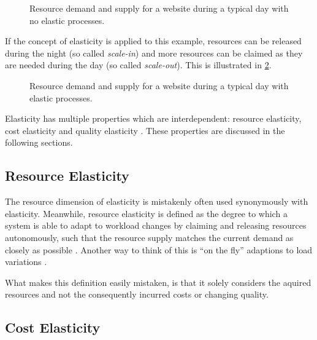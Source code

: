 \begin{figure}
    \centering
    
    \caption{Resource demand and supply for a website during a typical day with no elastic processes.}
    \label{fig:elasticity-application-no-scaling}
\end{figure}

If the concept of elasticity is applied to this example, resources can be released during the night (so called \textit{scale-in}) and more resources can be claimed as they are needed during the day (so called \textit{scale-out}). This is illustrated in \cref{fig:elasticity-application-scaling}.

\begin{figure}
    \centering
    
    \caption{Resource demand and supply for a website during a typical day with elastic processes.}
    \label{fig:elasticity-application-scaling}
\end{figure}

Elasticity has multiple properties which are interdependent: resource elasticity, cost elasticity and quality elasticity \cite{dustdarPrinciplesElasticProcesses2011}. These properties are discussed in the following sections.

\subsection{Resource Elasticity}

The resource dimension of elasticity is mistakenly often used synonymously with elasticity. Meanwhile, resource elasticity is defined as the degree to which a system is able to adapt to workload changes by claiming and releasing resources autonomously, such that the resource supply matches the current demand as closely as possible \cite{herbstElasticityCloudComputing2013}. Another way to think of this is ``on the fly'' adaptions to load variations \cite{al-dhuraibiElasticityCloudComputing2018}.

What makes this definition easily mistaken, is that it solely considers the aquired resources and not the consequently incurred costs or changing quality.


\subsection{Cost Elasticity}

